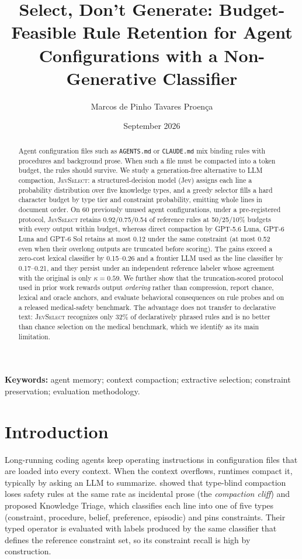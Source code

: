 \documentclass[11pt,a4paper]{article}
\title{Select, Don't Generate: Budget-Feasible Rule Retention for Agent Configurations with a Non-Generative Classifier}
\author{Marcos de Pinho Tavares Proen\c{c}a}
\date{September 2026}
\newcommand{\sel}{\textsc{JevSelect}}
\begin{document}
\maketitle

\begin{abstract}
\noindent
Agent configuration files such as \texttt{AGENTS.md} or \texttt{CLAUDE.md} mix binding rules with procedures and background prose. When such a file must be compacted into a token budget, the rules should survive. We study a generation-free alternative to LLM compaction, \sel{}: a structured-decision model (Jev) assigns each line a probability distribution over five knowledge types, and a greedy selector fills a hard character budget by type tier and constraint probability, emitting whole lines in document order. On 60 previously unused agent configurations, under a pre-registered protocol, \sel{} retains 0.92/0.75/0.54 of reference rules at 50/25/10\% budgets with every output within budget, whereas direct compaction by GPT-5.6 Luna, GPT-6 Luna and GPT-6 Sol retains at most 0.12 under the same constraint (at most 0.52 even when their overlong outputs are truncated before scoring). The gains exceed a zero-cost lexical classifier by 0.15--0.26 and a frontier LLM used as the line classifier by 0.17--0.21, and they persist under an independent reference labeler whose agreement with the original is only $\kappa=0.59$. We further show that the truncation-scored protocol used in prior work rewards output \emph{ordering} rather than compression, report chance, lexical and oracle anchors, and evaluate behavioral consequences on rule probes and on a released medical-safety benchmark. The advantage does not transfer to declarative text: \sel{} recognizes only 32\% of declaratively phrased rules and is no better than chance selection on the medical benchmark, which we identify as its main limitation.
\end{abstract}

\noindent\textbf{Keywords:} agent memory; context compaction; extractive selection; constraint preservation; evaluation methodology.

\section{Introduction}
Long-running coding agents keep operating instructions in configuration files that are loaded into every context. When the context overflows, runtimes compact it, typically by asking an LLM to summarize. \citet{zerhoudi2026cliff} showed that type-blind compaction loses safety rules at the same rate as incidental prose (the \emph{compaction cliff}) and proposed Knowledge Triage, which classifies each line into one of five types (constraint, procedure, belief, preference, episodic) and pins constraints. Their typed operator is evaluated with labels produced by the same classifier that defines the reference constraint set, so its constraint recall is high by construction.
\end{document}

